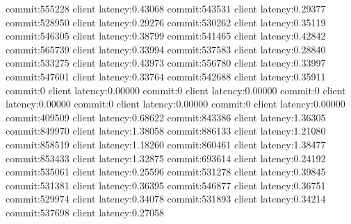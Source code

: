 commit:555228 client latency:0.43068
commit:543531 client latency:0.29377
commit:528950 client latency:0.29276
commit:530262 client latency:0.35119
commit:546305 client latency:0.38799
commit:541465 client latency:0.42842
commit:565739 client latency:0.33994
commit:537583 client latency:0.28840
commit:533275 client latency:0.43973
commit:556780 client latency:0.33997
commit:547601 client latency:0.33764
commit:542688 client latency:0.35911
commit:0 client latency:0.00000
commit:0 client latency:0.00000
commit:0 client latency:0.00000
commit:0 client latency:0.00000
commit:0 client latency:0.00000
commit:409509 client latency:0.68622
commit:843386 client latency:1.36305
commit:849970 client latency:1.38058
commit:886133 client latency:1.21080
commit:858519 client latency:1.18260
commit:860461 client latency:1.38477
commit:853433 client latency:1.32875
commit:693614 client latency:0.24192
commit:535061 client latency:0.25596
commit:531278 client latency:0.39845
commit:531381 client latency:0.36395
commit:546877 client latency:0.36751
commit:529974 client latency:0.34078
commit:531893 client latency:0.34214
commit:537698 client latency:0.27058